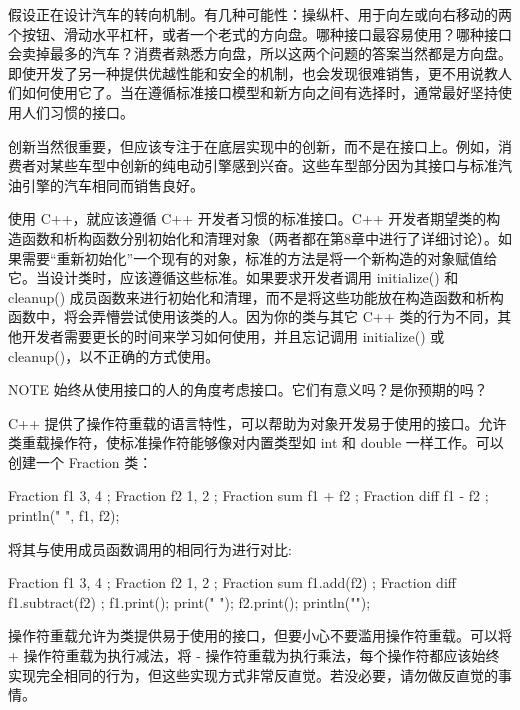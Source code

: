 假设正在设计汽车的转向机制。有几种可能性：操纵杆、用于向左或向右移动的两个按钮、滑动水平杠杆，或者一个老式的方向盘。哪种接口最容易使用？哪种接口会卖掉最多的汽车？消费者熟悉方向盘，所以这两个问题的答案当然都是方向盘。即使开发了另一种提供优越性能和安全的机制，也会发现很难销售，更不用说教人们如何使用它了。当在遵循标准接口模型和新方向之间有选择时，通常最好坚持使用人们习惯的接口。

创新当然很重要，但应该专注于在底层实现中的创新，而不是在接口上。例如，消费者对某些车型中创新的纯电动引擎感到兴奋。这些车型部分因为其接口与标准汽油引擎的汽车相同而销售良好。

使用 C++，就应该遵循 C++ 开发者习惯的标准接口。C++ 开发者期望类的构造函数和析构函数分别初始化和清理对象（两者都在第8章中进行了详细讨论）。如果需要“重新初始化”一个现有的对象，标准的方法是将一个新构造的对象赋值给它。当设计类时，应该遵循这些标准。如果要求开发者调用 initialize() 和 cleanup() 成员函数来进行初始化和清理，而不是将这些功能放在构造函数和析构函数中，将会弄懵尝试使用该类的人。因为你的类与其它 C++ 类的行为不同，其他开发者需要更长的时间来学习如何使用，并且忘记调用 initialize() 或 cleanup()，以不正确的方式使用。

\begin{myNotic}{NOTE}
始终从使用接口的人的角度考虑接口。它们有意义吗？是你预期的吗？
\end{myNotic}

C++ 提供了操作符重载的语言特性，可以帮助为对象开发易于使用的接口。允许类重载操作符，使标准操作符能够像对内置类型如 int 和 double 一样工作。可以创建一个 Fraction 类：

\begin{cpp}
Fraction f1 { 3, 4 };
Fraction f2 { 1, 2 };
Fraction sum { f1 + f2 };
Fraction diff { f1 - f2 };
println("{} {}", f1, f2);
\end{cpp}

将其与使用成员函数调用的相同行为进行对比:

\begin{cpp}
Fraction f1 { 3, 4 };
Fraction f2 { 1, 2 };
Fraction sum { f1.add(f2) };
Fraction diff { f1.subtract(f2) };
f1.print();
print(" ");
f2.print();
println("");
\end{cpp}

操作符重载允许为类提供易于使用的接口，但要小心不要滥用操作符重载。可以将 + 操作符重载为执行减法，将 - 操作符重载为执行乘法，每个操作符都应该始终实现完全相同的行为，但这些实现方式非常反直觉。若没必要，请勿做反直觉的事情。


